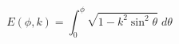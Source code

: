 \documentclass[12pt]{article}
\begin{document}
\begin{displaymath}
E(\phi, k) = \int_0^\phi \sqrt{1-k^2\sin^2\theta} \; d\theta
\end{displaymath}
\end{document}
